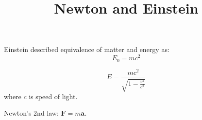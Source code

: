 \documentclass[a4paper]{article}
\title{Newton and Einstein}
\begin{document}
\maketitle

Einstein described equivalence
of matter and energy as: 
$$ E_0=mc^2 $$

$$ E=\frac{mc^2}{\sqrt{1-\frac{v^2}{c^2}}} $$
where $c$ is speed of light.

Newton's 2nd law: $\mathbf{F}=m\mathbf{a}$.
\end{document}
